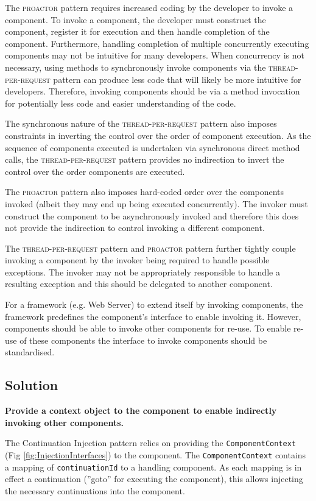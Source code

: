 \documentclass[prodmode]{style/acmlarge}
\begin{document}
The \textsc{proactor} pattern requires increased coding by the developer to
invoke a component.  To invoke a component, the developer must construct the
component, register it for execution and then handle completion of the
component.  Furthermore, handling completion of multiple concurrently executing
components may not be intuitive for many developers.  When concurrency is not
necessary, using methods to synchronously invoke components via the
\textsc{thread-per-request} pattern can produce less code that will likely be
more intuitive for developers.  Therefore, invoking components should be via a
method invocation for potentially less code and easier understanding of the
code.

The synchronous nature of the \textsc{thread-per-request} pattern also imposes
constraints in inverting the control over the order of component execution.  As
the sequence of components executed is undertaken via synchronous direct method
calls, the \textsc{thread-per-request} pattern provides no indirection to invert
the control over the order components are executed.

The \textsc{proactor} pattern also imposes hard-coded order over the components
invoked (albeit they may end up being executed concurrently).  The invoker must
construct the component to be asynchronously invoked and therefore this does not
provide the indirection to control invoking a different component.

The \textsc{thread-per-request} pattern and \textsc{proactor} pattern further
tightly couple invoking a component by the invoker being required to handle
possible exceptions.  The invoker may not be appropriately responsible to handle
a resulting exception and this should be delegated to another component.

For a framework (e.g. Web Server) to extend itself by invoking components, the
framework predefines the component's interface to enable invoking it.  However,
components should be able to invoke other components for re-use.  To enable
re-use of these components the interface to invoke components should be
standardised.


\subsection{Solution}

\textbf{Provide a context object to the component to enable indirectly invoking other components.}

The Continuation Injection pattern relies on providing the
\texttt{ComponentContext} (Fig \ref{fig:InjectionInterfaces}) to the component.
The \texttt{ComponentContext} contains a mapping of \texttt{continuationId} to a
handling component.  As each mapping is in effect a continuation (''goto'' for
executing the component), this allows injecting the necessary continuations into
the component.
\end{document}

